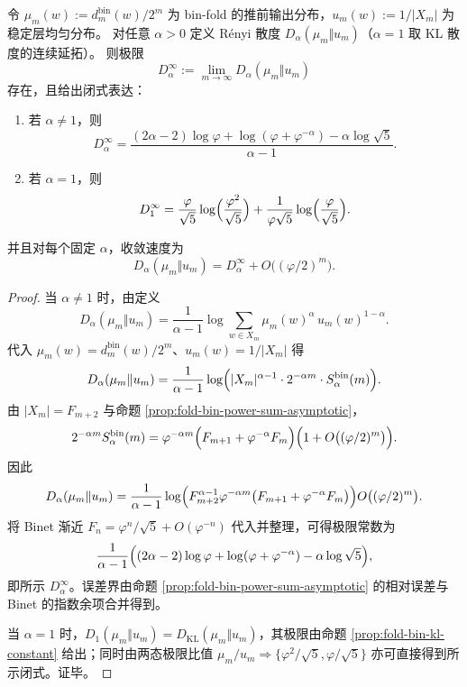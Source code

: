 \begin{theorem}\label{thm:fold-bin-renyi-divergence-limit}
令 \(\mu_m(w):=d^{\mathrm{bin}}_m(w)/2^m\) 为 bin-fold 的推前输出分布，\(u_m(w):=1/|X_m|\) 为稳定层均匀分布。
对任意 \(\alpha>0\) 定义 Rényi 散度 \(D_\alpha(\mu_m\Vert u_m)\)（\(\alpha=1\) 取 KL 散度的连续延拓）。
则极限
\[
D_\alpha^\infty:=\lim_{m\to\infty}D_\alpha(\mu_m\Vert u_m)
\]
存在，且给出闭式表达：
\begin{enumerate}
  \item 若 \(\alpha\neq 1\)，则
  \[
  D_\alpha^\infty=\frac{(2\alpha-2)\log\varphi+\log(\varphi+\varphi^{-\alpha})-\alpha\log\sqrt{5}}{\alpha-1}.
  \]
  \item 若 \(\alpha=1\)，则
  \[
  D_1^\infty=\frac{\varphi}{\sqrt5}\log\Bigl(\frac{\varphi^2}{\sqrt5}\Bigr)+\frac{1}{\varphi\sqrt5}\log\Bigl(\frac{\varphi}{\sqrt5}\Bigr).
  \]
\end{enumerate}
并且对每个固定 \(\alpha\)，收敛速度为
\[
D_\alpha(\mu_m\Vert u_m)=D_\alpha^\infty+O\bigl((\varphi/2)^m\bigr).
\]
\end{theorem}

\begin{proof}
当 \(\alpha\neq 1\) 时，由定义
\[
D_\alpha(\mu_m\Vert u_m)
=\frac{1}{\alpha-1}\log\sum_{w\in X_m}\mu_m(w)^\alpha\,u_m(w)^{1-\alpha}.
\]
代入 \(\mu_m(w)=d^{\mathrm{bin}}_m(w)/2^m\)、\(u_m(w)=1/|X_m|\) 得
\[
D_\alpha(\mu_m\Vert u_m)
=\frac{1}{\alpha-1}\log\Bigl(|X_m|^{\alpha-1}\cdot 2^{-\alpha m}\cdot S_\alpha^{\mathrm{bin}}(m)\Bigr).
\]
由 \(|X_m|=F_{m+2}\) 与命题 \ref{prop:fold-bin-power-sum-asymptotic}，
\[
2^{-\alpha m}S_\alpha^{\mathrm{bin}}(m)
=\varphi^{-\alpha m}\Bigl(F_{m+1}+\varphi^{-\alpha}F_m\Bigr)\Bigl(1+O\bigl((\varphi/2)^m\bigr)\Bigr).
\]
因此
\[
D_\alpha(\mu_m\Vert u_m)
=\frac{1}{\alpha-1}\log\Bigl(F_{m+2}^{\alpha-1}\varphi^{-\alpha m}\bigl(F_{m+1}+\varphi^{-\alpha}F_m\bigr)\Bigr)
O\bigl((\varphi/2)^m\bigr).
\]
将 Binet 渐近 \(F_n=\varphi^n/\sqrt5+O(\varphi^{-n})\) 代入并整理，可得极限常数为
\[
\frac{1}{\alpha-1}\Bigl((2\alpha-2)\log\varphi+\log(\varphi+\varphi^{-\alpha})-\alpha\log\sqrt5\Bigr),
\]
即所示 \(D_\alpha^\infty\)。误差界由命题 \ref{prop:fold-bin-power-sum-asymptotic} 的相对误差与 Binet 的指数余项合并得到。
\par
当 \(\alpha=1\) 时，\(D_1(\mu_m\Vert u_m)=D_{\mathrm{KL}}(\mu_m\Vert u_m)\)，其极限由命题 \ref{prop:fold-bin-kl-constant} 给出；同时由两态极限比值 \(\mu_m/u_m\Rightarrow\{\varphi^2/\sqrt5,\varphi/\sqrt5\}\) 亦可直接得到所示闭式。证毕。
\end{proof}


